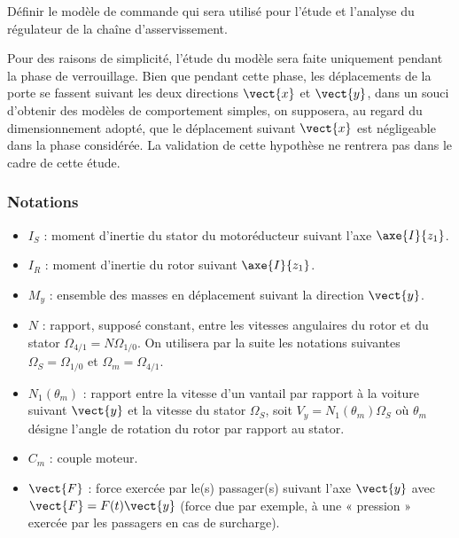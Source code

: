 \setcounter{exo}{0}


\begin{obj}
Définir le modèle de commande qui sera utilisé pour l’étude et l’analyse
du régulateur de la chaîne d’asservissement.
\end{obj}


Pour des raisons de simplicité, l’étude du modèle sera faite uniquement pendant
la phase de verrouillage. Bien que pendant cette phase, les déplacements de la
porte se fassent suivant les deux directions $\vect{x}$ et $\vect{y}$, dans un souci d’obtenir des
modèles de comportement simples, on supposera, au regard du dimensionnement
adopté, que le déplacement suivant $\vect{x}$ est négligeable dans la phase considérée.
La validation de cette hypothèse ne rentrera pas dans le cadre de cette
étude.



\subsubsection*{Notations}
\begin{itemize}
\item $I_S$ : moment d’inertie du stator du motoréducteur suivant l’axe $\axe{I}{z_1}$.
\item $I_R$ : moment d’inertie du rotor suivant $\axe{I}{z_1}$.
\item $M_y$ : ensemble des masses en déplacement suivant la direction $\vect{y}$.
\item $N$ : rapport, supposé constant, entre les vitesses angulaires du rotor et du stator $\Omega_{4/1}=N\Omega_{1/0}$. On utilisera par la suite les notations suivantes $\Omega_S=\Omega_{1/0}$ et $\Omega_m = \Omega_{4/1}$.
\item $N_1\left(\theta_m\right)$ : rapport entre la vitesse d’un vantail par rapport à la voiture suivant $\vect{y}$ et la vitesse du stator $\Omega_S$, soit $V_y=N_1\left(\theta_m\right)\Omega_S$ où $\theta_m$ désigne l’angle de rotation
du rotor par rapport au stator.
\item $C_m$ : couple moteur.
\item $\vect{F}$ : force exercée par le(s) passager(s) suivant l’axe $\vect{y}$ avec $\vect{F}=F(t)\vect{y} $  (force due
par exemple, à une « pression » exercée par les passagers en cas de surcharge).
\end{itemize}

